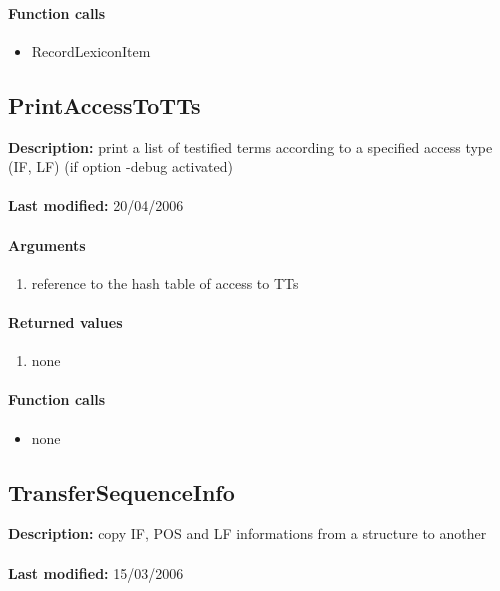 \paragraph{Function calls}
\begin{itemize}
\item RecordLexiconItem
\end{itemize}

\subsection{PrintAccessToTTs}
\textbf{Description:} print a list of testified terms according to a specified access type (IF, LF) (if option -debug activated)\\
\\\textbf{Last modified:} 20/04/2006

\paragraph{Arguments}
\begin{enumerate}
\item reference to the hash table of access to TTs
\end{enumerate}

\paragraph{Returned values}
\begin{enumerate}
\item none
\end{enumerate}

\paragraph{Function calls}
\begin{itemize}
\item none
\end{itemize}

\subsection{TransferSequenceInfo}
\textbf{Description:} copy IF, POS and LF informations from a structure to another\\
\\\textbf{Last modified:} 15/03/2006

